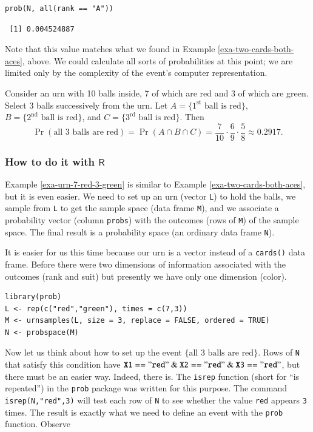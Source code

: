 \documentclass[captions=tableheading]{scrbook}
\begin{document}
\begin{verbatim}
prob(N, all(rank == "A"))
\end{verbatim}

\begin{verbatim}
 [1] 0.004524887
\end{verbatim}

Note that this value matches what we found in Example \ref{exa-two-cards-both-aces}, above. We could calculate all sorts of probabilities at this point; we are limited only by the complexity of the event's computer representation. 


\begin{example}
Consider an urn with 10 balls inside, 7 of which are red and 3 of which are green. Select 3 balls successively from the urn. Let \( A = \{ 1^{\mathrm{st}} \mbox{ ball is red} \} \), \( B = \{ 2^{\mathrm{nd}} \mbox{ ball is red} \} \), and \( C = \{ 3^{\mathrm{rd}} \mbox{ ball is red} \} \). Then
\[
\Pr(\mbox{all 3 balls are red})=\Pr(A\cap B\cap C)=\frac{7}{10}\cdot\frac{6}{9}\cdot\frac{5}{8}\approx 0.2917.
\]

\end{example}
\subsubsection{How to do it with \(\mathsf{R}\)}
\label{sec-4-6-2-2}


Example \ref{exa-urn-7-red-3-green} is similar to Example \ref{exa-two-cards-both-aces}, but it is even easier. We need to set up an urn (vector \texttt{L}) to hold the balls, we sample from \texttt{L} to get the sample space (data frame \texttt{M}), and we associate a probability vector (column \texttt{probs}) with the outcomes (rows of \texttt{M}) of the sample space. The final result is a probability space (an ordinary data frame \texttt{N}).

It is easier for us this time because our urn is a vector instead of a \texttt{cards()} data frame. Before there were two dimensions of information associated with the outcomes (rank and suit) but presently we have only one dimension (color).


\begin{verbatim}
library(prob)
L <- rep(c("red","green"), times = c(7,3))
M <- urnsamples(L, size = 3, replace = FALSE, ordered = TRUE)
N <- probspace(M)
\end{verbatim}

Now let us think about how to set up the event \(\{ \mbox{all 3 balls are red}\} \). Rows of \texttt{N} that satisfy this condition have \(\mathtt{X1=="red"\ \&\ X2=="red"\ \&\ X3=="red"}\), but there must be an easier way. Indeed, there is. The \texttt{isrep} function (short for ``is repeated'') in the \texttt{prob} package was written for this purpose. The command \texttt{isrep(N,"red",3)} will test each row of \texttt{N} to see whether the value \texttt{red} appears \texttt{3} times. The result is exactly what we need to define an event with the \texttt{prob} function. Observe
\end{document}
